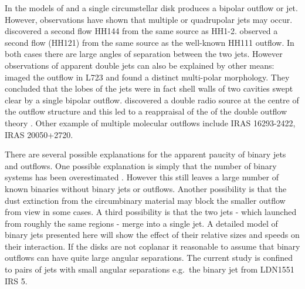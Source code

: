%
%
In the models of \citet{1997A&A...319..340F,1987ARA&A..25...23S} and \citet{1987IAUS..115..417S} a single circumstellar disk produces a bipolar outflow or jet.
However, observations have shown that multiple or quadrupolar jets may occur.
\citet{1993ApJ...408L..49R} discovered a second flow HH144 from the same source as HH1-2. 
\citet{1994A&A...289L..19G} observed a second flow (HH121) from the same source as the well-known HH111 outflow.
In both cases there are large angles of separation between the two jets.
However observations of apparent double jets can also be explained by other means: \citet{1990ApJ...357..524A} imaged the outflow in L723 and found a distinct multi-polar morphology. They concluded that the lobes of the jets were in fact shell walls of two cavities swept clear by a single bipolar outflow. \citet{1991ApJ...376..615A} discovered a double radio source at the centre of the outflow structure and this led to a reappraisal of the of the double outflow theory \citep{1996ApJ...473L.123A,1997ApJ...489..734G,1998ASPC..132..303A,1998ApJ...504..334H,1999A&A...346..233P,2002ApJ...575..337S,2003RMxAC..15..135E,2004RMxAC..21..100A}.
Other example of multiple molecular outflows include IRAS 16293-2422,  IRAS 20050+2720.

%
%

There are several possible explanations for the apparent paucity of binary jets and outflows.
One possible explanation is simply that the number of binary systems has been overestimated \citep{2006ApJ...640L..63L}.
However this still leaves a large number of known binaries without binary jets or outflows.
Another possibility is that the dust extinction from the circumbinary material may block the smaller outflow from view in some cases.
A third possibility is that the two jets - which launched from roughly the same regions - merge into a single jet.
A detailed model of binary jets presented here will show the effect of their relative sizes and speeds on their interaction.
If the disks are not coplanar \citep{1994ARA&A..32..465M} it reasonable to assume that binary outflows can have quite large angular separations.
The current study is confined to pairs of jets with small angular separations e.g.\ the binary jet from LDN1551 IRS 5.



